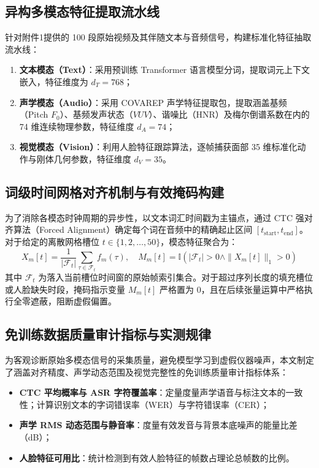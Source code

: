 \documentclass{huawei-mcm}
\begin{document}
\subsection{异构多模态特征提取流水线}
针对附件1提供的 100 段原始视频及其伴随文本与音频信号，构建标准化特征抽取流水线：
\begin{enumerate}[label=\textbf{(\arabic*)}, leftmargin=2.2em]
  \item \textbf{文本模态（Text）}：采用预训练 Transformer 语言模型分词，提取词元上下文嵌入，特征维度为 $d_T = 768$；
  \item \textbf{声学模态（Audio）}：采用 COVAREP 声学特征提取包，提取涵盖基频（Pitch $F_0$）、基频发声状态（$VUV$）、谐噪比（HNR）及梅尔倒谱系数在内的 74 维连续物理参数，特征维度 $d_A = 74$；
  \item \textbf{视觉模态（Vision）}：利用人脸特征跟踪算法，逐帧捕获面部 35 维标准化动作与刚体几何参数，特征维度 $d_V = 35$。
\end{enumerate}

\subsection{词级时间网格对齐机制与有效掩码构建}
为了消除各模态时钟周期的异步性，以文本词汇时间戳为主锚点，通过 CTC 强对齐算法（Forced Alignment）确定每个词在音频中的精确起止区间 $[t_{\mathrm{start}}, t_{\mathrm{end}}]$。
对于给定的离散网格槽位 $t \in \{1, 2, \dots, 50\}$，模态特征聚合为：
\begin{equation}
  X_m[t] = \frac{1}{|\mathcal{F}_t|} \sum_{\tau \in \mathcal{F}_t} f_m(\tau), \quad M_m[t] = \mathbb{I}\left( |\mathcal{F}_t| > 0 \land \|X_m[t]\|_1 > 0 \right)
\end{equation}
其中 $\mathcal{F}_t$ 为落入当前槽位时间窗的原始帧索引集合。对于超过序列长度的填充槽位或人脸缺失时段，掩码指示变量 $M_m[t]$ 严格置为 0，且在后续张量运算中严格执行全零遮蔽，阻断虚假偏置。

\subsection{免训练数据质量审计指标与实测规律}
为客观诊断原始多模态信号的采集质量，避免模型学习到虚假仪器噪声，本文制定了涵盖对齐精度、声学动态范围及视觉完整性的免训练质量审计指标体系：
\begin{itemize}[leftmargin=2.2em]
  \item \textbf{CTC 平均概率与 ASR 字符覆盖率}：定量度量声学语音与标注文本的一致性；计算识别文本的字词错误率（WER）与字符错误率（CER）；
  \item \textbf{声学 RMS 动态范围与静音率}：度量有效发音与背景本底噪声的能量比差（dB）；
  \item \textbf{人脸特征可用比}：统计检测到有效人脸特征的帧数占理论总帧数的比例。
\end{itemize}
\end{document}
